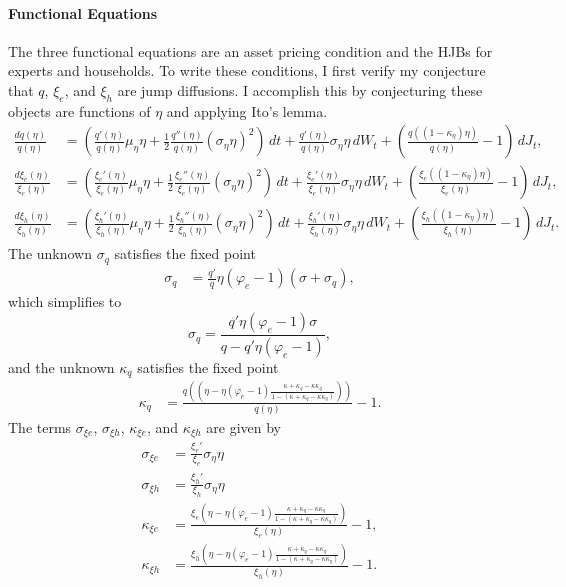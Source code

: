 \documentclass[12 pt, oneside]{article}
\theoremstyle{definition}
\theoremstyle{definition}
\theoremstyle{definition}
\begin{document}
\paragraph{Functional Equations}
The three functional equations are an asset pricing condition and the HJBs for experts and households. To write these conditions, I first verify my conjecture that $q$, $\xi_e$, and $\xi_h$ are jump diffusions. I accomplish this by conjecturing these objects are functions of $\eta$ and applying Ito's lemma.
\begin{align*}
  \frac{dq(\eta)}{q(\eta)} & = \left(\frac{q'(\eta)}{q(\eta)}\mu_\eta\eta + \frac{1}{2}\frac{q''(\eta)}{q(\eta)}(\sigma_\eta\eta)^2 \right)\, dt +\frac{ q'(\eta)}{q(\eta)}\sigma_\eta\eta\, dW_t + \left(\frac{q((1 - \kappa_\eta)\eta)}{q(\eta)} - 1\right)\, dJ_t,\\
  \frac{d\xi_e(\eta)}{\xi_e(\eta)} & = \left(\frac{\xi_e'(\eta)}{\xi_e(\eta)}\mu_\eta\eta + \frac{1}{2}\frac{\xi_e''(\eta)}{\xi_e(\eta)}(\sigma_\eta\eta)^2 \right)\, dt +\frac{ \xi_e'(\eta)}{\xi_e(\eta)}\sigma_\eta\eta\, dW_t + \left(\frac{\xi_e((1 - \kappa_\eta)\eta)}{\xi_e(\eta)} - 1\right)\, dJ_t,\\
  \frac{d\xi_h(\eta)}{\xi_h(\eta)} & = \left(\frac{\xi_h'(\eta)}{\xi_h(\eta)}\mu_\eta\eta + \frac{1}{2}\frac{\xi_h''(\eta)}{\xi_h(\eta)}(\sigma_\eta\eta)^2 \right)\, dt +\frac{ \xi_h'(\eta)}{\xi_h(\eta)}\sigma_\eta\eta\, dW_t + \left(\frac{\xi_h((1 - \kappa_\eta)\eta)}{\xi_h(\eta)} - 1\right)\, dJ_t.
\end{align*}
The unknown $\sigma_q$ satisfies the fixed point
\begin{align*}
\sigma_q & = \frac{q'}{q} \eta(\varphi_e - 1)(\sigma + \sigma_q),
\end{align*}
which simplifies to
\begin{equation}\label{eq:sigma q closed form}
  \sigma_q = \frac{q'\eta(\varphi_e - 1)\sigma}{q - q'\eta(\varphi_e - 1)},
\end{equation}
and the unknown $\kappa_q$ satisfies the fixed point
\begin{align}\label{eq:kappa q fixed point}
  \kappa_q & = \frac{q\left(\left(\eta - \eta(\varphi_e - 1)\frac{\kappa + \kappa_q - \kappa\kappa_q}{1 - (\kappa + \kappa_q - \kappa\kappa_q)}\right)\right)}{q(\eta)} - 1.
\end{align}
The terms $\sigma_{\xi e}$, $\sigma_{\xi h}$, $\kappa_{\xi e}$, and $\kappa_{\xi h}$ are given by
\begin{align}
\label{eq:sigma xi e closed form}
  \sigma_{\xi e} & = \frac{\xi_e'}{\xi_e}\sigma_\eta\eta\\
\label{eq:sigma xi h closed form}
  \sigma_{\xi h} & = \frac{\xi_h'}{\xi_h}\sigma_\eta\eta\\
\label{eq:kappa xi e closed form}
  \kappa_{\xi e} & = \frac{\xi_e\left(\eta - \eta(\varphi_e - 1)\frac{\kappa + \kappa_{q} - \kappa\kappa_{q}}{1 - (\kappa + \kappa_{q} - \kappa\kappa_{q})}\right)}{\xi_e(\eta)} - 1,\\
\label{eq:kappa xi h closed form}
  \kappa_{\xi h} & = \frac{\xi_h\left(\eta - \eta(\varphi_e - 1)\frac{\kappa + \kappa_{q} - \kappa\kappa_{q}}{1 - (\kappa + \kappa_{q} - \kappa\kappa_{q})}\right)}{\xi_h(\eta)} - 1.
\end{align}
\end{document}
